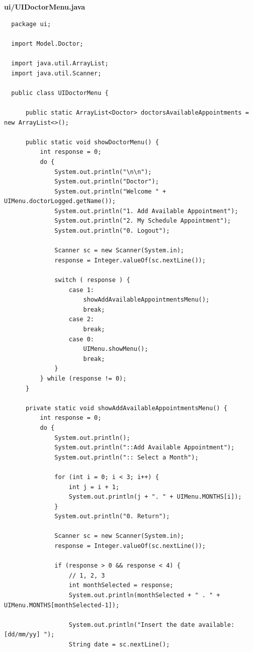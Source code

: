 \documentclass{article}
\begin{document}
\textbf{ui/UIDoctorMenu.java}
\begin{verbatim}
  package ui;

  import Model.Doctor;

  import java.util.ArrayList;
  import java.util.Scanner;

  public class UIDoctorMenu {

      public static ArrayList<Doctor> doctorsAvailableAppointments = new ArrayList<>();

      public static void showDoctorMenu() {
          int response = 0;
          do {
              System.out.println("\n\n");
              System.out.println("Doctor");
              System.out.println("Welcome " + UIMenu.doctorLogged.getName());
              System.out.println("1. Add Available Appointment");
              System.out.println("2. My Schedule Appointment");
              System.out.println("0. Logout");

              Scanner sc = new Scanner(System.in);
              response = Integer.valueOf(sc.nextLine());

              switch ( response ) {
                  case 1:
                      showAddAvailableAppointmentsMenu();
                      break;
                  case 2:
                      break;
                  case 0:
                      UIMenu.showMenu();
                      break;
              }
          } while (response != 0);
      }

      private static void showAddAvailableAppointmentsMenu() {
          int response = 0;
          do {
              System.out.println();
              System.out.println("::Add Available Appointment");
              System.out.println(":: Select a Month");

              for (int i = 0; i < 3; i++) {
                  int j = i + 1;
                  System.out.println(j + ". " + UIMenu.MONTHS[i]);
              }
              System.out.println("0. Return");

              Scanner sc = new Scanner(System.in);
              response = Integer.valueOf(sc.nextLine());

              if (response > 0 && response < 4) {
                  // 1, 2, 3
                  int monthSelected = response;
                  System.out.println(monthSelected + " . " + UIMenu.MONTHS[monthSelected-1]);

                  System.out.println("Insert the date available: [dd/mm/yy] ");
                  String date = sc.nextLine();


\end{verbatim}
\end{document}
